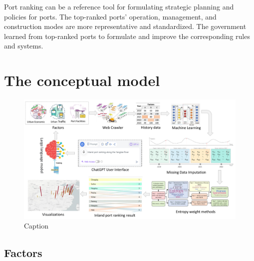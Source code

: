 \documentclass[preprint]{elsarticle}
\begin{document}
Port ranking can be a reference tool for formulating strategic planning and policies for ports. The top-ranked ports' operation, management, and construction modes are more representative and standardized. The government learned from top-ranked ports to formulate and improve the corresponding rules and systems.

\section{The conceptual model}
\begin{figure}[H]
    \centering
    \includegraphics[width=1.0\textwidth]{pic/autoportranking.pdf}
    \caption{Caption}
    \label{fig:enter-label}
\end{figure}
\subsection{Factors}
\end{document}
